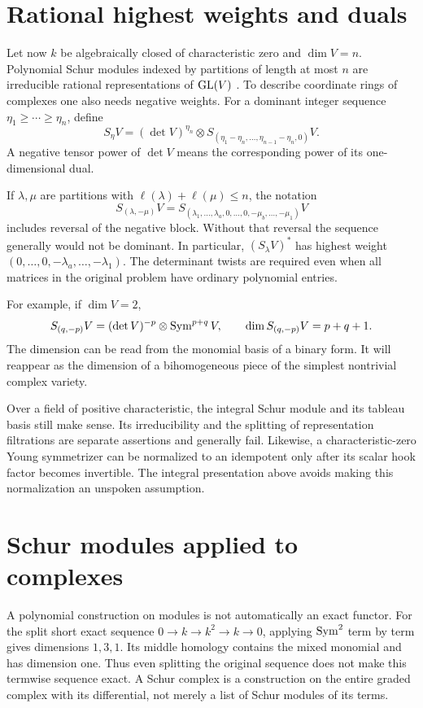 \section{Rational highest weights and duals}

Let now \(k\) be algebraically closed of characteristic zero and
\(\dim V=n\).  Polynomial Schur modules indexed by partitions of
length at most \(n\) are irreducible rational representations of
\(\operatorname{GL}(V)\) \cite{smtABW1982}.  To describe coordinate rings of complexes one also
needs negative weights.  For a dominant integer sequence
\(\eta_1\ge\cdots\ge\eta_n\), define
\[
 S_\eta V
  =(\det V)^{\eta_n}\otimes
       S_{(\eta_1-\eta_n,\ldots,\eta_{n-1}-\eta_n,0)}V.
\]
A negative tensor power of \(\det V\) means the corresponding
power of its one-dimensional dual.

If \(\lambda,\mu\) are partitions with
\(\ell(\lambda)+\ell(\mu)\le n\), the notation
\[
 S_{(\lambda,-\mu)}V
 = S_{(\lambda_1,\ldots,\lambda_a,
           0,\ldots,0,-\mu_b,\ldots,-\mu_1)}V
\]
includes reversal of the negative block.  Without that reversal
the sequence generally would not be dominant.  In particular,
\((S_\lambda V)^*\) has highest weight
\((0,\ldots,0,-\lambda_a,\ldots,-\lambda_1)\).
The determinant twists are required even when all matrices
in the original problem have ordinary polynomial entries.

For example, if \(\dim V=2\),
\[
 S_{(q,-p)}V
   =(\det V)^{-p}\otimes\operatorname{Sym}^{p+q}V,
 \qquad \dim S_{(q,-p)}V=p+q+1.
\]
The dimension can be read from the monomial basis of a binary
form.  It will reappear as the dimension of a bihomogeneous
piece of the simplest nontrivial complex variety.

Over a field of positive characteristic, the integral Schur
module and its tableau basis still make sense.  Its
irreducibility and the splitting of representation filtrations
are separate assertions and generally fail.  Likewise, a
characteristic-zero Young symmetrizer can be normalized to an
idempotent only after its scalar hook factor becomes invertible.
The integral presentation above avoids making this normalization
an unspoken assumption.

\section{Schur modules applied to complexes}

A polynomial construction on modules is not automatically an
exact functor.  For the split short exact sequence
\(0\to k\to k^2\to k\to0\), applying \(\operatorname{Sym}^2\) term by term
gives dimensions \(1,3,1\).  Its middle homology contains the
mixed monomial and has dimension one.  Thus even splitting
the original sequence does not make this termwise sequence
exact.  A Schur complex is a construction on the entire
graded complex with its differential, not merely a list of
Schur modules of its terms.

